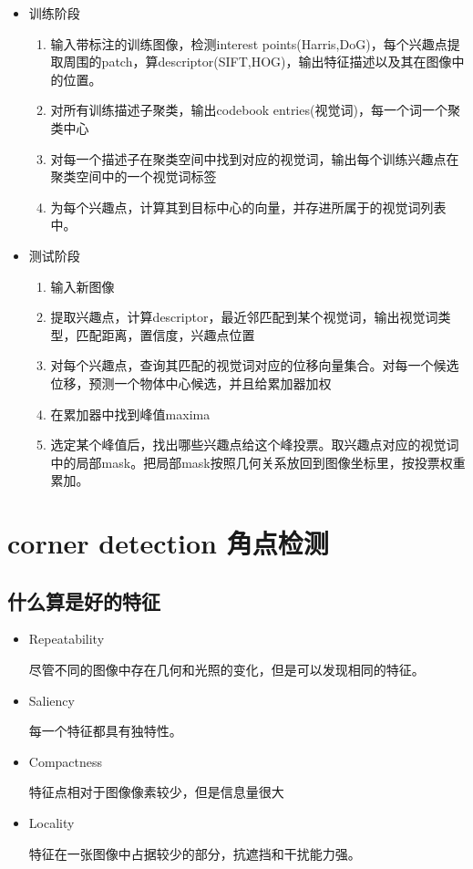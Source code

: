 \documentclass[UTF8]{ctexart}
\begin{document}
\begin{itemize}
    \begin{itemize}
        \item 训练阶段
        \begin{enumerate}
            \item 输入带标注的训练图像，检测interest points(Harris,DoG)，每个兴趣点提取周围的patch，算descriptor(SIFT,HOG)，输出特征描述以及其在图像中的位置。
            \item 对所有训练描述子聚类，输出codebook entries(视觉词)，每一个词一个聚类中心
            \item 对每一个描述子在聚类空间中找到对应的视觉词，输出每个训练兴趣点在聚类空间中的一个视觉词标签
            \item 为每个兴趣点，计算其到目标中心的向量，并存进所属于的视觉词列表中。
        \end{enumerate}
        \item 测试阶段
        \begin{enumerate}
            \item 输入新图像
            \item 提取兴趣点，计算descriptor，最近邻匹配到某个视觉词，输出视觉词类型，匹配距离，置信度，兴趣点位置
            \item 对每个兴趣点，查询其匹配的视觉词对应的位移向量集合。对每一个候选位移，预测一个物体中心候选，并且给累加器加权
            \item 在累加器中找到峰值maxima
            \item 选定某个峰值后，找出哪些兴趣点给这个峰投票。取兴趣点对应的视觉词中的局部mask。把局部mask按照几何关系放回到图像坐标里，按投票权重累加。
        \end{enumerate}
    \end{itemize}
    

\end{itemize}


\section{corner detection 角点检测}

\subsection{什么算是好的特征}
\begin{itemize}
    \item Repeatability
    
    尽管不同的图像中存在几何和光照的变化，但是可以发现相同的特征。
    \item Saliency
    
    每一个特征都具有独特性。
    \item Compactness
    
    特征点相对于图像像素较少，但是信息量很大
    \item Locality
    
    特征在一张图像中占据较少的部分，抗遮挡和干扰能力强。
\end{itemize}
\end{document}
